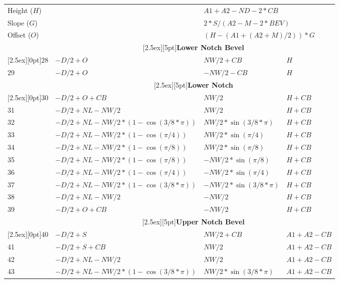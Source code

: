 \documentclass[a4paper, dvipdfm]{article}
\begin{document}
\begin{longtable}{|l|l|l|l|}
\hline
\multicolumn{2}{|l|}{Height ($H$)}  & \multicolumn{2}{|l|}{$A1+A2-ND-2*CB$}\\
\multicolumn{2}{|l|}{Slope ($G$)}   & \multicolumn{2}{|l|}{$2*S/(A2-M-2*BEV)$}\\
\multicolumn{2}{|l|}{Offset ($O$)}  & \multicolumn{2}{|l|}{$(H-(A1+(A2+M)/2))*G$}\\
\hline
&\multicolumn{3}{|c|}{\raisebox{0pt}[2.5ex][5pt]{\textbf{Lower Notch Bevel}}}\\\cline{2-4}
\raisebox{0pt}[2.5ex][0pt]{28}
   & $-D/2+O$       & $NW/2+CB$     & $H$\\
29 & $-D/2+O$       & $-NW/2-CB$    & $H$\\
\hline
&\multicolumn{3}{|c|}{\raisebox{0pt}[2.5ex][5pt]{\textbf{Lower Notch}}}\\\cline{2-4}
\raisebox{0pt}[2.5ex][0pt]{30}
   & $-D/2+O+CB$                      & $NW/2$                & $H+CB$\\
31 & $-D/2+NL-NW/2$                   & $NW/2$                & $H+CB$\\
32 & $-D/2+NL-NW/2*(1-\cos(3/8*\pi))$ & $NW/2*\sin(3/8*\pi)$  & $H+CB$\\
33 & $-D/2+NL-NW/2*(1-\cos(\pi/4))$   & $NW/2*\sin(\pi/4)$    & $H+CB$\\
34 & $-D/2+NL-NW/2*(1-\cos(\pi/8))$   & $NW/2*\sin(\pi/8)$    & $H+CB$\\
35 & $-D/2+NL-NW/2*(1-\cos(\pi/8))$   & $-NW/2*\sin(\pi/8)$   & $H+CB$\\
36 & $-D/2+NL-NW/2*(1-\cos(\pi/4))$   & $-NW/2*\sin(\pi/4)$   & $H+CB$\\
37 & $-D/2+NL-NW/2*(1-\cos(3/8*\pi))$ & $-NW/2*\sin(3/8*\pi)$ & $H+CB$\\
38 & $-D/2+NL-NW/2$                   & $-NW/2$               & $H+CB$\\
39 & $-D/2+O+CB$                      & $-NW/2$               & $H+CB$\\
\hline
&\multicolumn{3}{|c|}{\raisebox{0pt}[2.5ex][5pt]{\textbf{Upper Notch Bevel}}}\\\cline{2-4}
\raisebox{0pt}[2.5ex][0pt]{40}
   & $-D/2 + S$                       & $NW/2 + CB$           & $A1+A2-CB$\\
41 & $-D/2 + S + CB$                  & $NW/2$                & $A1+A2-CB$\\
42 & $-D/2+NL-NW/2$                   & $NW/2$                & $A1+A2-CB$\\
43 & $-D/2+NL-NW/2*(1-\cos(3/8*\pi))$ & $NW/2*\sin(3/8*\pi)$  & $A1+A2-CB$\\

\end{longtable}
\end{document}
